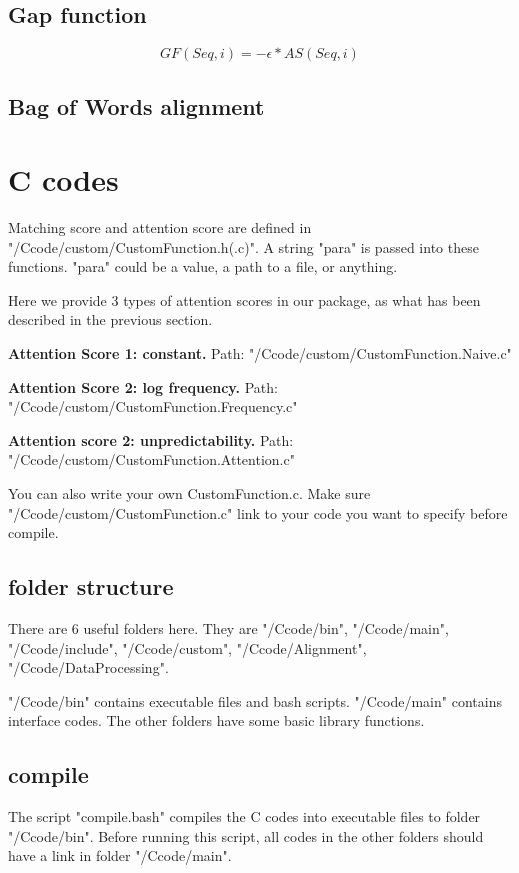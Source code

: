 \documentclass[a4paper]{article}
\begin{document}
\begin{CJK*}{UTF8}{kai}
\subsection{Gap function}

$$GF(Seq,i) = -\epsilon*AS(Seq,i)$$

\subsection{Bag of Words alignment}

\section{C codes}

Matching score and attention score are defined in "/Ccode/custom/CustomFunction.h(.c)". A string "para" is passed into these functions. "para" could be a value, a path to a file, or anything.

Here we provide 3 types of attention scores in our package, as what has been described in the previous section.

\noindent
\textbf{Attention Score 1: constant.} Path: "/Ccode/custom/CustomFunction.Naive.c"

\noindent
\textbf{Attention Score 2: log frequency.} Path: "/Ccode/custom/CustomFunction.Frequency.c"

\noindent
\textbf{Attention score 2: unpredictability.} Path: "/Ccode/custom/CustomFunction.Attention.c"

You can also write your own CustomFunction.c. Make sure "/Ccode/custom/CustomFunction.c" link to your code you want to specify before compile.

\subsection{folder structure}
There are 6 useful folders here. They are "/Ccode/bin", "/Ccode/main", "/Ccode/include", "/Ccode/custom", "/Ccode/Alignment", "/Ccode/DataProcessing".

"/Ccode/bin" contains executable files and bash scripts. "/Ccode/main" contains interface codes. The other folders have some basic library functions.

\subsection{compile}

The script "compile.bash" compiles the C codes into executable files to folder "/Ccode/bin". Before running this script, all codes in the other folders should have a link in folder "/Ccode/main".


\end{CJK*}
\end{document}
